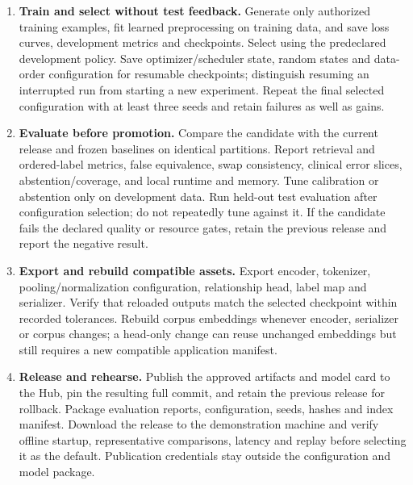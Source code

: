 \documentclass[10pt,letterpaper]{article}
\begin{document}
\begin{enumerate}
chosen machine. A frozen-embedding head is the lower-cost first experiment;
full encoder fine-tuning may benefit from a separate GPU machine. Reduce
batch size or use validated gradient accumulation if memory is insufficient;
record the effective batch and any change to negative sampling. Do not claim
identical contrastive behavior merely because effective batch sizes match.
\item \textbf{Train and select without test feedback.} Generate only
authorized training examples, fit learned preprocessing on training data,
and save loss curves, development metrics and checkpoints. Select using the
predeclared development policy. Save optimizer/scheduler state, random states
and data-order configuration for resumable checkpoints; distinguish resuming
an interrupted run from starting a new experiment. Repeat the final selected
configuration with at least three seeds and retain failures as well as gains.
\item \textbf{Evaluate before promotion.} Compare the candidate with the
current release and frozen baselines on identical partitions. Report
retrieval and ordered-label metrics, false equivalence, swap consistency,
clinical error slices, abstention/coverage, and local runtime and memory.
Tune calibration or abstention only on development data. Run held-out test
evaluation after configuration selection; do not repeatedly tune against it.
If the candidate fails the declared quality or resource gates, retain the
previous release and report the negative result.
\item \textbf{Export and rebuild compatible assets.} Export encoder,
tokenizer, pooling/normalization configuration, relationship head, label map
and serializer. Verify that reloaded outputs match the selected checkpoint
within recorded tolerances. Rebuild corpus embeddings whenever encoder,
serializer or corpus changes; a head-only change can reuse unchanged
embeddings but still requires a new compatible application manifest.
\item \textbf{Release and rehearse.} Publish the approved artifacts and
model card to the Hub, pin the resulting full commit, and retain the previous
release for rollback. Package evaluation reports, configuration, seeds,
hashes and index manifest. Download the release to the demonstration machine
and verify offline startup, representative comparisons, latency and replay
before selecting it as the default. Publication credentials stay outside
the configuration and model package.
\end{enumerate}
\end{document}
